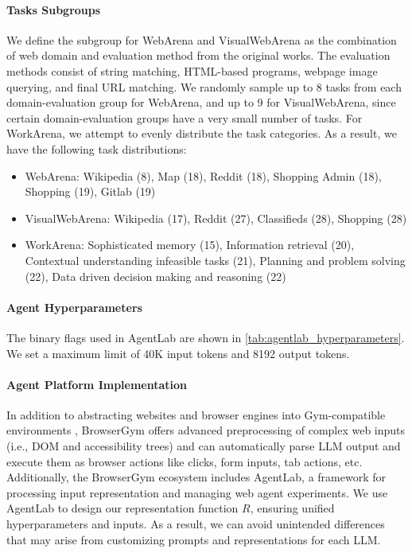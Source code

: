 \documentclass{article} %
\begin{document}
\paragraph{Tasks Subgroups}
\label{sec:appendix_tasks_subgrouping}
We define the subgroup for WebArena and VisualWebArena as the combination of web domain and evaluation method from the original works. The evaluation methods consist of string matching, HTML-based programs, webpage image querying, and final URL matching. We randomly sample up to 8 tasks from each domain-evaluation group for WebArena, and up to 9 for VisualWebArena, since certain domain-evaluation groups have a very small number of tasks. For WorkArena, we attempt to evenly distribute the task categories. As a result, we have the following task distributions:

\begin{itemize}
    \item WebArena: Wikipedia (8), Map (18), Reddit (18), Shopping Admin (18), Shopping (19), Gitlab (19)
    \item VisualWebArena: Wikipedia (17), Reddit (27), Classifieds (28), Shopping (28)
    \item WorkArena: Sophisticated memory (15), Information retrieval (20), Contextual understanding infeasible tasks (21), Planning and problem solving (22), Data driven decision making and reasoning (22)
\end{itemize}


\paragraph{Agent Hyperparameters} The binary flags used in AgentLab \citep{browsergym_platform} are shown in \cref{tab:agentlab_hyperparameters}. We set a maximum limit of 40K input tokens and 8192 output tokens.

\paragraph{Agent Platform Implementation}
\label{sec:appendix_agent_platform}

In addition to abstracting websites and browser engines into Gym-compatible environments \citep{brockman2016openaigym}, BrowserGym \citep{workarena_l1,browsergym_platform} offers advanced preprocessing of complex web inputs (i.e., DOM and accessibility trees) and can automatically parse LLM output and execute them as browser actions like clicks, form inputs, tab actions, etc. Additionally, the BrowserGym ecosystem includes AgentLab, a framework for processing input representation and managing web agent experiments. We use AgentLab to design our representation function $R$, ensuring unified hyperparameters and inputs. As a result, we can avoid unintended differences that may arise from customizing prompts and representations for each LLM.
\end{document}
